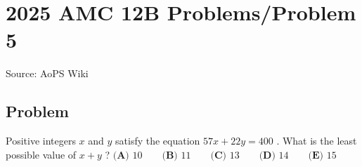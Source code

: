\documentclass[12pt]{article}
\begin{document}
\section*{{2025 AMC 12B Problems/Problem 5}}
Source: AoPS Wiki

\subsection*{Problem}
Positive integers $x$ and $y$ satisfy the equation $57x+ 22y = 400$ . What is the least possible value of $x+y$ ? $\textbf{(A) } 10 \qquad\textbf{(B) } 11 \qquad\textbf{(C) } 13 \qquad\textbf{(D) } 14 \qquad\textbf{(E) } 15$
\end{document}
